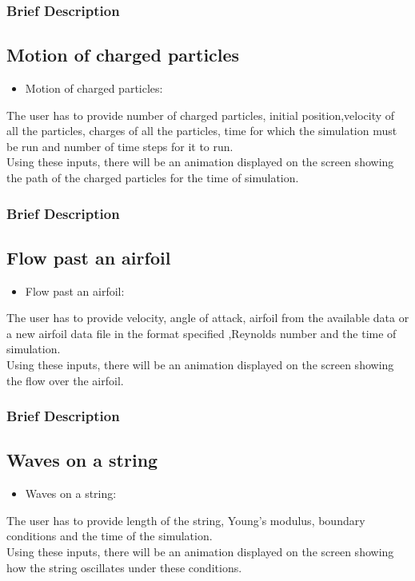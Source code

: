 \documentclass{beamer}
\begin{document}
\begin{frame}
\frametitle{Brief Description}
\subsection{Motion of charged particles}
\begin{itemize}
\item {Motion of charged particles:}
\end{itemize}
The user has to provide number of charged particles, initial position,velocity of all the particles, charges of all the particles, time for which the simulation must be run and number of time steps for it to run. \\
Using these inputs, there will be an animation displayed on the screen showing the path of the charged particles for the time of simulation. 
\end{frame}

\begin{frame}
\frametitle{Brief Description}
\subsection{Flow past an airfoil}
\begin{itemize}
\item {Flow past an airfoil:}
\end{itemize}
The user has to provide velocity, angle of attack, airfoil from the available data or a new airfoil data file in the format specified ,Reynolds number and the time of simulation. \\
Using these inputs, there will be an animation displayed on the screen showing the flow over the airfoil. 
\end{frame}

\begin{frame}
\frametitle{Brief Description}
\subsection{Waves on a string}
\begin{itemize}
\item {Waves on a string:}
\end{itemize}
The user has to provide length of the string, Young's modulus, boundary conditions and the time of the simulation. \\
Using these inputs, there will be an animation displayed on the screen showing how the string oscillates under these conditions.
\end{frame}
\end{document}
